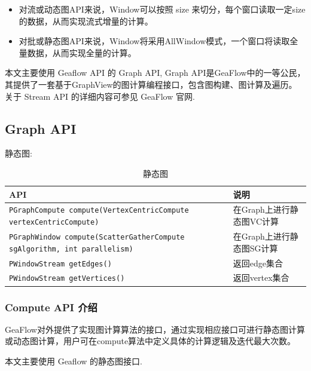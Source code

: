 \begin{itemize}
  \item 对流或动态图API来说，Window可以按照 size 来切分，每个窗口读取一定size的数据，从而实现流式增量的计算。
  \item 对批或静态图API来说，Window将采用AllWindow模式，一个窗口将读取全量数据，从而实现全量的计算。
\end{itemize}

本文主要使用 Geaflow API 的 Graph API, Graph API是GeaFlow中的一等公民，其提供了一套基于GraphView的图计算编程接口，包含图构建、图计算及遍历。
关于 Stream API 的详细内容可参见 GeaFlow 官网\cite{ref1}.

\subsection{Graph API}
静态图:
\begin{table}[H]
  \caption{静态图}
  \begin{center}
    \begin{tabularx}{\textwidth}{Xl}
      \toprule
      \textbf{API} & \textbf{说明} \\
      \midrule
      \texttt{PGraphCompute compute(VertexCentricCompute vertexCentricCompute)} & 在Graph上进行静态图VC计算 \\
      \texttt{PGraphWindow compute(ScatterGatherCompute sgAlgorithm, int parallelism)} & 在Graph上进行静态图SG计算 \\
      \texttt{PWindowStream getEdges()} & 返回edge集合 \\
      \texttt{PWindowStream getVertices()} & 返回vertex集合 \\
      \bottomrule
    \end{tabularx}
  \end{center}
\end{table}

\subsubsection{Compute API 介绍}
GeaFlow对外提供了实现图计算算法的接口，通过实现相应接口可进行静态图计算或动态图计算，用户可在compute算法中定义具体的计算逻辑及迭代最大次数。

本文主要使用 Geaflow 的静态图接口.

